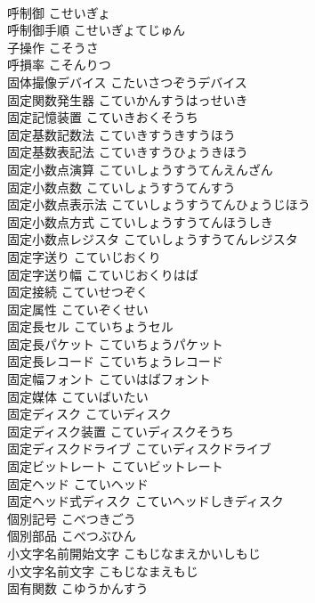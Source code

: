 \documentclass[8pt]{extreport}
\begin{document}
\begin{CJK}{UTF8}{min}
\\	呼制御	こせいぎょ	
\\	呼制御手順	こせいぎょてじゅん	
\\	子操作	こそうさ	
\\	呼損率	こそんりつ	
\\	固体撮像デバイス	こたいさつぞうデバイス	
\\	固定関数発生器	こていかんすうはっせいき	
\\	固定記憶装置	こていきおくそうち	
\\	固定基数記数法	こていきすうきすうほう	
\\	固定基数表記法	こていきすうひょうきほう	
\\	固定小数点演算	こていしょうすうてんえんざん	
\\	固定小数点数	こていしょうすうてんすう	
\\	固定小数点表示法	こていしょうすうてんひょうじほう	
\\	固定小数点方式	こていしょうすうてんほうしき	
\\	固定小数点レジスタ	こていしょうすうてんレジスタ	
\\	固定字送り	こていじおくり	
\\	固定字送り幅	こていじおくりはば	
\\	固定接続	こていせつぞく	
\\	固定属性	こていぞくせい	
\\	固定長セル	こていちょうセル	
\\	固定長パケット	こていちょうパケット	
\\	固定長レコード	こていちょうレコード	
\\	固定幅フォント	こていはばフォント	
\\	固定媒体	こていばいたい	
\\	固定ディスク	こていディスク	
\\	固定ディスク装置	こていディスクそうち	
\\	固定ディスクドライブ	こていディスクドライブ	
\\	固定ビットレート	こていビットレート	
\\	固定ヘッド	こていヘッド	
\\	固定ヘッド式ディスク	こていヘッドしきディスク	
\\	個別記号	こべつきごう	
\\	個別部品	こべつぶひん	
\\	小文字名前開始文字	こもじなまえかいしもじ	
\\	小文字名前文字	こもじなまえもじ	
\\	固有関数	こゆうかんすう	

\end{CJK}
\end{document}
